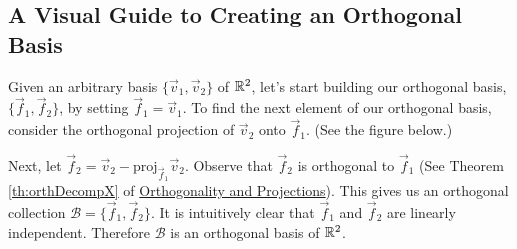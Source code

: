 \documentclass{ximera}
\begin{document}
\subsection*{A Visual Guide to Creating an Orthogonal Basis}  
Given an arbitrary basis $\{\vec{v}_1, \vec{v}_2\}$ of $\mathbb{R}^2$, let's start building our orthogonal basis, $\{\vec{f}_1, \vec{f}_2\}$, by setting $\vec{f}_1 = \vec{v}_1$. To find the next element of our orthogonal basis, consider the orthogonal projection of $\vec{v}_2$ onto $\vec{f}_1$.  (See the figure below.)  
\begin{center}
 \quad\quad
{}
\end{center}
Next, let $\vec{f}_2=\vec{v}_2-\mbox{proj}_{\vec{f}_1}\vec{v}_2$.  Observe that $\vec{f}_2$ is orthogonal to $\vec{f}_1$ (See Theorem \ref{th:orthDecompX} of \href{https://ximera.osu.edu/linearalgebradzv3/LinearAlgebraInteractiveIntro/RTH-0010/main}{Orthogonality and Projections}).  This gives us an orthogonal collection $\mathcal{B}=\{\vec{f}_1,\vec{f}_2\}$.  It is intuitively clear that $\vec{f}_1$ and $\vec{f}_2$ are linearly independent.  Therefore $\mathcal{B}$ is an orthogonal basis of $\mathbb{R}^2$.
\end{document}
